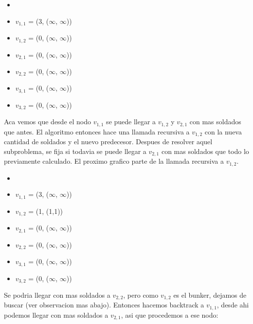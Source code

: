 \begin{multicols}{2}
\columnbreak
\columnbreak
  \begin{itemize}[noitemsep]
      \item[]
      \item $v_{1,1}$ = (3, ($\infty$, $\infty$))
      \item $v_{1,2}$ = (0, ($\infty$, $\infty$))
      \item $v_{2,1}$ = (0, ($\infty$, $\infty$))
      \item $v_{2,2}$ = (0, ($\infty$, $\infty$))
      \item $v_{3,1}$ = (0, ($\infty$, $\infty$))
      \item $v_{3,2}$ = (0, ($\infty$, $\infty$))
    \end{itemize}
\end{multicols}

Aca vemos que desde el nodo $v_{1,1}$ se puede llegar a $v_{1,2}$ y $v_{2,1}$ con mas soldados que antes. El algoritmo entonces hace una llamada recursiva a $v_{1,2}$ con la nueva cantidad de soldados y el nuevo predecesor. Despues de resolver aquel subproblema, se fija si todavia se puede llegar a $v_{2,1}$ con mas soldados que todo lo previamente calculado. El proximo grafico parte de la llamada recursiva a $v_{1,2}$.

\begin{multicols}{2}
\columnbreak
\columnbreak
  \begin{itemize}[noitemsep]
      \item[]
      \item $v_{1,1}$ = (3, ($\infty$, $\infty$))
      \item $v_{1,2}$ = (1, (1,1))
      \item $v_{2,1}$ = (0, ($\infty$, $\infty$))
      \item $v_{2,2}$ = (0, ($\infty$, $\infty$))
      \item $v_{3,1}$ = (0, ($\infty$, $\infty$))
      \item $v_{3,2}$ = (0, ($\infty$, $\infty$))
    \end{itemize}
\end{multicols}

Se podria llegar con mas soldados a $v_{2,2}$, pero como $v_{1,2}$ es el bunker, dejamos de buscar (ver observacion mas abajo).
Entonces hacemos backtrack a $v_{1,1}$, desde ahi podemos llegar con mas soldados a $v_{2,1}$, asi que procedemos a ese nodo:

